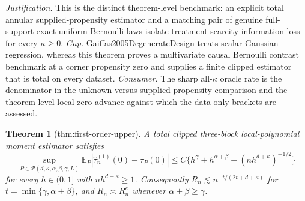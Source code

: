 \documentclass{article}
\newtheorem{theorem}{Theorem}
\begin{document}
\par\smallskip\noindent \textit{Justification.} This is the distinct theorem-level benchmark: an explicit total annular supplied-propensity estimator and a matching pair of genuine full-support exact-uniform Bernoulli laws isolate treatment-scarcity information loss for every \(\kappa\geq0\). \textit{Gap.} Gaiffas2005DegenerateDesign treats scalar Gaussian regression, whereas this theorem proves a multivariate causal Bernoulli contrast benchmark at a corner propensity zero and supplies a finite clipped estimator that is total on every dataset. \textit{Consumer.} The sharp all-\(\kappa\) oracle rate is the denominator in the unknown-versus-supplied propensity comparison and the theorem-level local-zero advance against which the data-only brackets are assessed.

\begin{theorem}[thm:first-order-upper]\label{thm:first-order-upper}
A total clipped three-block local-polynomial moment estimator satisfies \[\sup_{P\in\mathcal P(d,\kappa,\alpha,\beta,\gamma,L)}\mathbb E_P|\widehat\tau_n^{(1)}(0)-\tau_P(0)|\le C\{h^{\gamma}+h^{\alpha+\beta}+(nh^{d+\kappa})^{-1/2}\}\] for every \(h\in(0,1]\) with \(nh^{d+\kappa}\ge1\). Consequently \(R_n\lesssim n^{-t/(2t+d+\kappa)}\) for \(t=\min\{\gamma,\alpha+\beta\}\), and \(R_n\asymp R_n^e\) whenever \(\alpha+\beta\ge\gamma\).
\end{theorem}
\end{document}
